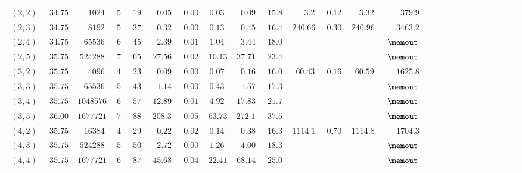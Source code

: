 \begin{table}[h!]
\begin{tabular}{|r|r|r||r|r|r|r|r|r|r||r|r|r|r|r|r|r|r|r|r|r|r|r|r|r|}
\hline $\ (2,2)\ $ & $\ 34.75\ $ & $\ 1024\ $ & $\ 5\ $ & $\ 19\ $ & $\ 0.05\ $ & $\ 0.00\ $ & $\ 0.03\ $  & $\ 0.09\ $ & $\ 15.8\ $ & $\ 3.2\ $ & $\ 0.12\ $  & $\ 3.32\ $ & $\ 379.9\ $\rule[-3pt]{0pt}{10pt}\\
$\ (2,3)\ $ & $\ 34.75\ $ & $\ 8192\ $ & $\ 5\ $ & $\ 37\ $ & $\ 0.32\ $ & $\ 0.00\ $ & $\ 0.13\ $  & $\ 0.45\ $ & $\ 16.4\ $ & $\ 240.66\ $ & $\ 0.30\ $  & $\ 240.96\ $ & $\ 3463.2\ $\rule[-3pt]{0pt}{10pt}\\
$\ (2,4)\ $ & $\ 34.75\ $ & $\ 65536\ $ & $\ 6\ $ & $\ 45\ $ & $\ 2.39\ $ & $\ 0.01\ $ & $\ 1.04\ $  & $\ 3.44\ $ & $\ 18.0\ $ & $\ \ $ & $\ \ $  & $\ \ $ & $\ \memout\ $\rule[-3pt]{0pt}{10pt}\\
$\ (2,5)\ $ & $\ 35.75\ $ & $\ 524288\ $ & $\ 7\ $ & $\ 65\ $ & $\ 27.56\ $ & $\ 0.02\ $ & $\ 10.13\ $  & $\ 37.71\ $ & $\ 23.4\ $ & $\ \ $ & $\ \ $  & $\ \ $ & $\ \memout\ $\rule[-3pt]{0pt}{10pt}\\
\hline $\ (3,2)\ $ & $\ 35.75\ $ & $\ 4096\ $ & $\ 4\ $ & $\ 23\ $ & $\ 0.09\ $ & $\ 0.00\ $ & $\ 0.07\ $  & $\ 0.16\ $ & $\ 16.0\ $ & $\ 60.43\ $ & $\ 0.16\ $  & $\ 60.59\ $ & $\ 1625.8\ $\rule[-3pt]{0pt}{10pt}\\
$\ (3,3)\ $ & $\ 35.75\ $ & $\ 65536\ $ & $\ 5\ $ & $\ 43\ $ & $\ 1.14\ $ & $\ 0.00\ $ & $\ 0.43\ $  & $\ 1.57\ $ & $\ 17.3\ $ & $\ \ $ & $\ \ $  & $\ \ $ & $\ \memout\ $\rule[-3pt]{0pt}{10pt}\\
$\ (3,4)\ $ & $\ 35.75\ $ & $\ 1048576\ $ & $\ 6\ $ & $\ 57\ $ & $\ 12.89\ $ & $\ 0.01\ $ & $\ 4.92\ $  & $\ 17.83\ $ & $\ 21.7\ $ & $\ \ $ & $\ \ $  & $\ \ $ & $\ \memout\ $\rule[-3pt]{0pt}{10pt}\\
$\ (3,5)\ $ & $\ 36.00\ $ & $\ 16777216\ $ & $\ 7\ $ & $\ 88\ $ & $\ 208.33\ $ & $\ 0.05\ $ & $\ 63.73\ $  & $\ 272.13\ $ & $\ 37.5\ $ & $\ \ $ & $\ \ $  & $\ \ $ & $\ \memout\ $\rule[-3pt]{0pt}{10pt}\\
\hline $\ (4,2)\ $ & $\ 35.75\ $ & $\ 16384\ $ & $\ 4\ $ & $\ 29\ $ & $\ 0.22\ $ & $\ 0.02\ $ & $\ 0.14\ $  & $\ 0.38\ $ & $\ 16.3\ $ & $\ 1114.19\ $ & $\ 0.70\ $  & $\ 1114.89\ $ & $\ 1704.3\ $\rule[-3pt]{0pt}{10pt}\\
$\ (4,3)\ $ & $\ 35.75\ $ & $\ 524288\ $ & $\ 5\ $ & $\ 50\ $ & $\ 2.72\ $ & $\ 0.00\ $ & $\ 1.26\ $  & $\ 4.00\ $ & $\ 18.3\ $ & $\ \ $ & $\ \ $  & $\ \ $ & $\ \memout\ $\rule[-3pt]{0pt}{10pt}\\
$\ (4,4)\ $ & $\ 35.75\ $ & $\ 16777216\ $ & $\ 6\ $ & $\ 87\ $ & $\ 45.68\ $ & $\ 0.04\ $ & $\ 22.41\ $  & $\ 68.14\ $ & $\ 25.0\ $ & $\ \ $ & $\ \ $  & $\ \ $ & $\ \memout\ $\rule[-3pt]{0pt}{10pt}\\

\end{tabular}
\end{table}
